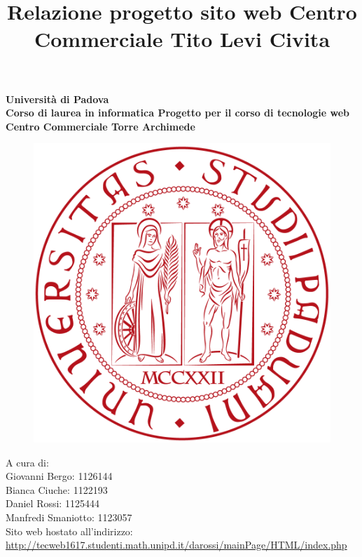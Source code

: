 \documentclass[a4paper,12pt]{article}
\begin{document}
\title{Relazione progetto sito web Centro Commerciale Tito Levi Civita}
\begin{titlepage}
	\pagestyle{empty}
	\centering
	\vfill
	{
		\bfseries
		\vskip2cm
		\Large Università di Padova\\
		\Large Corso di laurea in informatica
		\vfill
		\Large Progetto per il corso di tecnologie web\\
		\Huge Centro Commerciale Torre Archimede\\
		\vfill
		
		\begin{figure}
			\centering
			\includegraphics[width=0.6\linewidth]{images/LogoPadova}
		\end{figure}
		A cura di:\\
		\Large Giovanni Bergo:		1126144\\ Bianca Ciuche:		1122193 \\Daniel Rossi:		1125444\\ Manfredi Smaniotto:	1123057\\
		\vfill
		Sito web hostato all'indirizzo: \url{http://tecweb1617.studenti.math.unipd.it/darossi/mainPage/HTML/index.php}\\
		\vfill
	}
\end{titlepage}
\tableofcontents
\pagestyle{empty}
\newpage
\pagestyle{fancy}
\fancyhead[RE,LO]{}
\fancyfoot[CE,CO]{}
\end{document}

